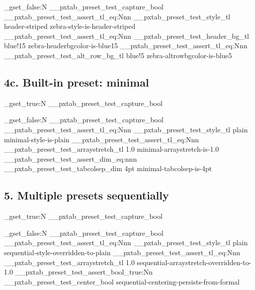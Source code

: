 \documentclass{article}
\begin{document}

\ExplSyntaxOn
\bool_gset_false:N \g__pxtab_preset_test_capture_bool
\__pxtab_preset_test_assert_tl_eq:Nnn
  \g__pxtab_preset_test_style_tl { header-striped }
  { zebra-style-is-header-striped }
\__pxtab_preset_test_assert_tl_eq:Nnn
  \g__pxtab_preset_test_header_bg_tl { blue!15 }
  { zebra-headerbgcolor-is-blue15 }
\__pxtab_preset_test_assert_tl_eq:Nnn
  \g__pxtab_preset_test_alt_row_bg_tl { blue!5 }
  { zebra-altrowbgcolor-is-blue5 }
\ExplSyntaxOff

\subsection*{4c. Built-in preset: minimal}

\ExplSyntaxOn
\bool_gset_true:N \g__pxtab_preset_test_capture_bool
\ExplSyntaxOff


\ExplSyntaxOn
\bool_gset_false:N \g__pxtab_preset_test_capture_bool
\__pxtab_preset_test_assert_tl_eq:Nnn
  \g__pxtab_preset_test_style_tl { plain }
  { minimal-style-is-plain }
\__pxtab_preset_test_assert_tl_eq:Nnn
  \g__pxtab_preset_test_arraystretch_tl { 1.0 }
  { minimal-arraystretch-is-1.0 }
\__pxtab_preset_test_assert_dim_eq:nnn
  { \g__pxtab_preset_test_tabcolsep_dim }
  { 4pt }
  { minimal-tabcolsep-is-4pt }
\ExplSyntaxOff

\subsection*{5. Multiple presets sequentially}

\ExplSyntaxOn
\bool_gset_true:N \g__pxtab_preset_test_capture_bool
\ExplSyntaxOff

\begingroup
\endgroup

\ExplSyntaxOn
\bool_gset_false:N \g__pxtab_preset_test_capture_bool
\__pxtab_preset_test_assert_tl_eq:Nnn
  \g__pxtab_preset_test_style_tl { plain }
  { sequential-style-overridden-to-plain }
\__pxtab_preset_test_assert_tl_eq:Nnn
  \g__pxtab_preset_test_arraystretch_tl { 1.0 }
  { sequential-arraystretch-overridden-to-1.0 }
\__pxtab_preset_test_assert_bool_true:Nn
  \g__pxtab_preset_test_center_bool
  { sequential-centering-persists-from-formal }
\ExplSyntaxOff
\end{document}
